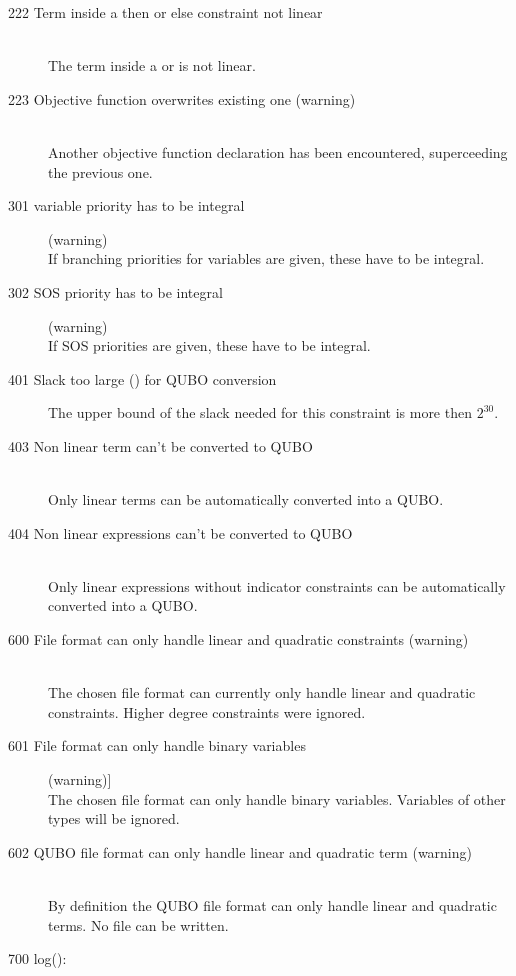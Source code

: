 \begin{description}
\item[222 Term inside a then or else constraint not linear]\ \\
  The term inside a  or  is not linear.
\item[223 Objective function  overwrites existing one
  (warning)]\ \\
  Another objective function declaration has been encountered,
  superceeding the previous one. 
\item[301 variable priority has to be integral] (warning)\ \\
   If branching priorities for variables are given, these have to be integral.
\item[302 SOS priority has to be integral] (warning)\ \\
   If SOS priorities are given, these have to be integral.
\item [401 Slack too large () for QUBO conversion]
   The upper bound of the slack needed for this constraint is more then
   $2^{30}$.   
\item [403 Non linear term can't be converted to QUBO]\ \\
  Only linear terms can be automatically converted into a QUBO.
\item [404 Non linear expressions can't be converted to QUBO]\ \\
  Only linear expressions without indicator constraints can be
  automatically converted into a QUBO. 
\item[600 File format can only handle linear and quadratic constraints
         (warning)]\ \\
  The chosen file format can currently only handle linear and
  quadratic constraints. Higher degree constraints were ignored.
\item[601 File format can only handle binary variables] (warning)]\ \\
  The chosen file format can only handle binary variables. 
  Variables of other types will be ignored.
\item[602 QUBO file format can only handle linear and quadratic term
         (warning)]\ \\
  By definition the QUBO file format can only handle linear and
  quadratic terms. No file can be written.
%
%
% 
%
\item[700 log(): ]\ \\

\end{description}
